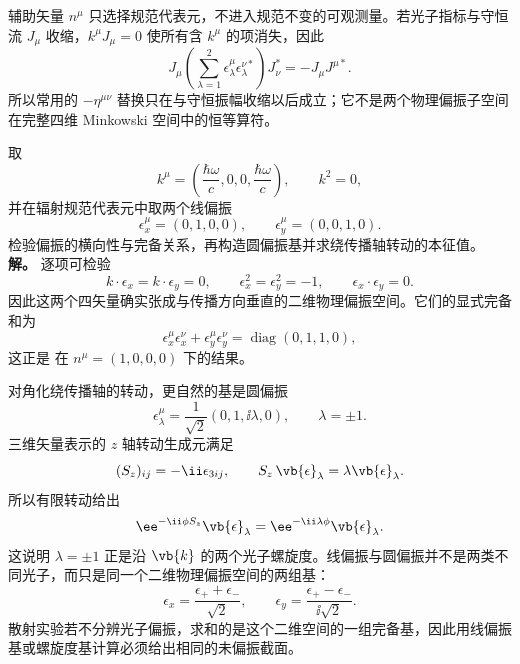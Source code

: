 辅助矢量 $n^\mu$ 只选择规范代表元，不进入规范不变的可观测量。若光子指标与守恒流 $J_\mu$ 收缩，$k^\mu J_\mu=0$ 使所有含 $k^\mu$ 的项消失，因此
\begin{equation}
 {
 J_\mu
 \left(\sum_{\lambda=1}^{2}
 \epsilon_\lambda^\mu\epsilon_\lambda^{\nu *}\right)
 J_\nu^*
 =-J_\mu J^{\mu *}.}
 \label{eq:physical-photon-polarization-conserved-current-dp42}
\end{equation}
所以常用的 $-\eta^{\mu\nu}$ 替换只在与守恒振幅收缩以后成立；它不是两个物理偏振子空间在完整四维 Minkowski 空间中的恒等算符。

\begin{exbox}[$z$ 方向光子的偏振与螺旋度]
取
\begin{equation*}
 k^\mu=\left(\frac{\hbar\omega}{c},0,0,\frac{\hbar\omega}{c}\right),
 \qquad k^2=0,
\end{equation*}
并在辐射规范代表元中取两个线偏振
\begin{equation*}
 \epsilon_x^\mu=(0,1,0,0),
 \qquad
 \epsilon_y^\mu=(0,0,1,0).
\end{equation*}
检验偏振的横向性与完备关系，再构造圆偏振基并求绕传播轴转动的本征值。
\textbf{解。} 逐项可检验
\begin{equation*}
 k\!\cdot\epsilon_x=k\!\cdot\epsilon_y=0,
 \qquad
 \epsilon_x^2=\epsilon_y^2=-1,
 \qquad
 \epsilon_x\!\cdot\epsilon_y=0.
\end{equation*}
因此这两个四矢量确实张成与传播方向垂直的二维物理偏振空间。它们的显式完备和为
\begin{equation*}
 \epsilon_x^\mu\epsilon_x^\nu
 +\epsilon_y^\mu\epsilon_y^\nu
 =\operatorname{diag}(0,1,1,0),
\end{equation*}
这正是 在 $n^\mu=(1,0,0,0)$ 下的结果。

对角化绕传播轴的转动，更自然的基是圆偏振
\begin{equation}
 \epsilon_\lambda^\mu
 =\frac1{\sqrt2}
 \left(0,1,\ii\lambda,0\right),
 \qquad \lambda=\pm1.
 \label{eq:photon-circular-polarizations-dp62}
\end{equation}
三维矢量表示的 $z$ 轴转动生成元满足
\begin{equation*}
 (S_z)_{ij}=-\ii\epsilon_{3ij},
 \qquad
 S_z\,\vb{\epsilon}_\lambda
 =\lambda\vb{\epsilon}_\lambda.
\end{equation*}
所以有限转动给出
\begin{equation*}
 \ee^{-\ii\phi S_z}\vb{\epsilon}_\lambda
 =\ee^{-\ii\lambda\phi}\vb{\epsilon}_\lambda.
\end{equation*}
这说明 $\lambda=\pm1$ 正是沿 $\vb{k}$ 的两个光子螺旋度。线偏振与圆偏振并不是两类不同光子，而只是同一个二维物理偏振空间的两组基：
\begin{equation*}
 \epsilon_x=\frac{\epsilon_++\epsilon_-}{\sqrt2},
 \qquad
 \epsilon_y=\frac{\epsilon_+-\epsilon_-}{\ii\sqrt2}.
\end{equation*}
散射实验若不分辨光子偏振，求和的是这个二维空间的一组完备基，因此用线偏振基或螺旋度基计算必须给出相同的未偏振截面。
\end{exbox}


